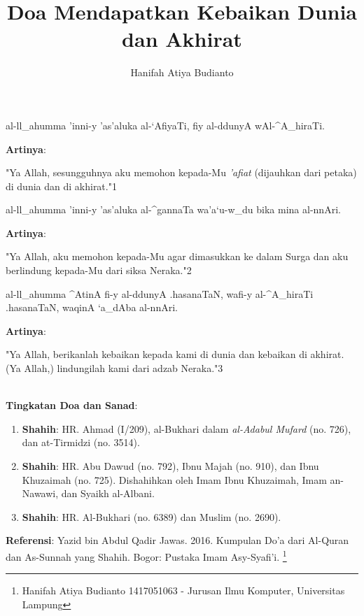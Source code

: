 \documentclass[a4paper,12pt]{article}
\title{\Large Doa Mendapatkan Kebaikan Dunia dan Akhirat}
\author{\calligra Hanifah Atiya Budianto}
\begin{document}
\sffamily
\maketitle 
\fullvocalize
{}
\begin{arabtext}
\noindent
al-ll_ahumma 'inni-y 'as'aluka al-`AfiyaTi, fiy al-ddunyA wAl-^A_hiraTi.\\
\end{arabtext}
\noindent
\textbf{Artinya}:
\par
\indent
"Ya Allah, sesungguhnya aku memohon kepada-Mu \textit{'afiat} (dijauhkan 
dari petaka) di dunia dan di akhirat."{\scriptsize 1}\\
\begin{arabtext}
\noindent
al-ll_ahumma 'inni-y 'as'aluka al-^gannaTa wa'a`u-w_du bika mina al-nnAri.
\\
\end{arabtext}
\noindent
\textbf{Artinya}:
\par
\indent
"Ya Allah, aku memohon kepada-Mu agar dimasukkan ke dalam Surga dan aku 
berlindung kepada-Mu dari siksa Neraka."{\scriptsize 2}\\
\begin{arabtext}
\noindent
al-ll_ahumma ^AtinA fi-y al-ddunyA .hasanaTaN, wafi-y al-^A_hiraTi 
.hasanaTaN, waqinA `a_dAba al-nnAri.\\
\end{arabtext}
\noindent
\textbf{Artinya}:
\par
\indent
"Ya Allah, berikanlah kebaikan kepada kami di dunia dan kebaikan di 
akhirat. (Ya Allah,) lindungilah kami dari adzab Neraka."{\scriptsize 3}
\\\\
\par
\noindent
\textbf{Tingkatan Doa dan Sanad}:
\begin{enumerate}
\item \textbf{Shahih}: HR. Ahmad (I/209), al-Bukhari dalam 
\textit{al-Adabul Mufard} (no. 726), dan at-Tirmidzi (no. 3514).
\item \textbf{Shahih}: HR. Abu Dawud (no. 792), Ibnu Majah (no. 910), dan 
Ibnu Khuzaimah (no. 725). Dishahihkan oleh Imam Ibnu Khuzaimah, Imam 
an-Nawawi, dan Syaikh al-Albani.
\item \textbf{Shahih}: HR. Al-Bukhari (no. 6389) dan Muslim (no. 2690).
\end{enumerate}
\textbf{Referensi}: Yazid bin Abdul Qadir Jawas. 2016. Kumpulan Do'a dari
Al-Quran dan As-Sunnah yang Shahih. Bogor: Pustaka Imam Asy-Syafi'i.
\footnote{Hanifah Atiya Budianto 1417051063 - Jurusan Ilmu Komputer,
Universitas Lampung}
\end{document}

